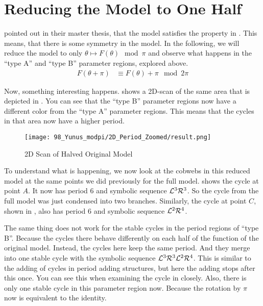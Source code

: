 \section{Reducing the Model to One Half}
\label{sec:og.halved}

 pointed out in their master thesis, that the model satisfies the property in .
This means, that there is some symmetry in the model.
In the following, we will reduce the model to only $\theta \mapsto F(\theta) \mod \pi$ and observe what happens in the ``type A'' and ``type B'' parameter regions, explored above.
\begin{align}
    F(\theta + \pi) & \equiv F(\theta) + \pi \mod 2 \pi \label{equ:yunus.property.symmetry}
\end{align}

Now, something interesting happens.
 shows a 2D-scan of the same area that is depicted in .
You can see that the ``type B'' parameter regions now have a different color from the ``type A'' parameter regions.
This means that the cycles in that area now have a higher period.

\begin{figure}
    \centering
    \texttt{[image: 98\_Yunus\_modpi/2D\_Period\_Zoomed/result.png]}
    \caption{2D Scan of Halved Original Model}
    \label{fig:yunus.pi.2d.full}
\end{figure}

To understand what is happening, we now look at the cobwebs in this reduced model at the same points we did previously for the full model.
 shows the cycle at point $A$.
It now has period 6 and symbolic sequence $\mathcal{L}^3\mathcal{R}^3$.
So the cycle from the full model was just condensed into two branches.
Similarly, the cycle at point $C$, shown in , also has period 6 and symbolic sequence $\mathcal{L}^2\mathcal{R}^4$.

The same thing does not work for the stable cycles in the period regions of ``type B''.
Because the cycles there behave differently on each half of the function of the original model.
Instead, the cycles here keep the same period.
And they merge into one stable cycle with the symbolic sequence $\mathcal{L}^3\mathcal{R}^3\mathcal{L}^2\mathcal{R}^4$.
This is similar to the adding of cycles in period adding structures, but here the adding stops after this once.
You can see this when examining the cycle in  closely.
Also, there is only one stable cycle in this parameter region now.
Because the rotation by $\pi$ now is equivalent to the identity.

